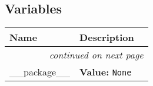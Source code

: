   \subsection{Variables}

    \vspace{-1cm}
\hspace{\varindent}\begin{longtable}{|p{\varnamewidth}|p{\vardescrwidth}|l}
\cline{1-2}
\cline{1-2} \centering \textbf{Name} & \centering \textbf{Description}& \\
\cline{1-2}
\endhead\cline{1-2}\multicolumn{3}{r}{\small\textit{continued on next page}}\\\endfoot\cline{1-2}
\endlastfoot\raggedright \_\-\_\-p\-a\-c\-k\-a\-g\-e\-\_\-\_\- & \raggedright \textbf{Value:} 
{\tt None}&\\
\cline{1-2}
\end{longtable}

